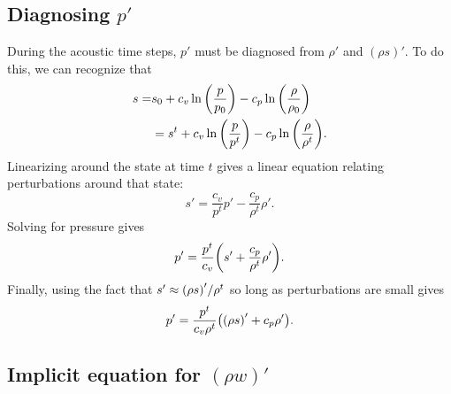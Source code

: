 \documentclass[11pt]{article}
\begin{document}
\subsection{Diagnosing $p'$}

During the acoustic time steps, $p'$ must be diagnosed from $\rho'$ and $(\rho s)'$. To do this, we can recognize that
\begin{align*}
s =& s_0 + c_v \ln \qty (\frac{p}{p_0}) - c_p \ln \qty(\frac{\rho}{\rho_0}) \\
&= s^t + c_v \ln \qty (\frac{p}{p^t}) - c_p \ln \qty(\frac{\rho}{\rho^t}).
\end{align*}
Linearizing around the state at time $t$ gives a linear equation relating perturbations around that state:
\begin{equation*}
s' = \frac{c_v}{p^t} p' - \frac{c_p}{\rho^t} \rho'.
\end{equation*}
Solving for pressure gives
\begin{equation*}
p' = \frac{p^t}{c_v} \qty (s' + \frac{c_p}{\rho^t} \rho').
\end{equation*}
Finally, using the fact that $s' \approx \qty(\rho s)' / \rho^t$ so long as perturbations are small gives
\begin{equation}
p' = \frac{p^t}{c_v \rho^t} \qty ( \qty(\rho s)' + c_p \rho').
\end{equation}

\subsection{Implicit equation for $(\rho w)'$}
\end{document}
